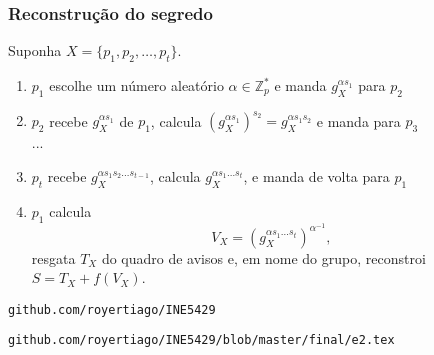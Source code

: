 \documentclass{beamer}
\begin{document}
\begin{frame}
    \frametitle{Reconstrução do segredo}
    Suponha $X = \{p_1, p_2, \ldots, p_t\}$.
    \begin{enumerate}
        \item<2-> $p_1$ escolhe um número aleatório $\alpha \in \mathbb Z_p^*$
            e manda $g_X^{\alpha s_1}$ para $p_2$
        \item<3-> $p_2$ recebe $g_X^{\alpha s_1}$ de $p_1$,
            calcula $(g_X^{\alpha s_1})^{s_2} = g_X^{\alpha s_1 s_2}$
            e manda para $p_3$ \\
            ...
        \item<4-> $p_t$ recebe $g_X^{\alpha s_1 s_2 \dots s_{t-1}}$,
            calcula $g_X^{\alpha s_1 \dots s_t}$,
            e manda de volta para $p_1$
        \item<5-> $p_1$ calcula
            \begin{equation*}
                V_X = (g_X^{\alpha s_1 \dots s_t})^{\alpha^{-1}},
            \end{equation*}
            resgata $T_X$ do quadro de avisos e,
            em nome do grupo,
            reconstroi $S = T_X + f(V_X)$.
    \end{enumerate}
\end{frame}

\begin{frame}

    \texttt{github.com/royertiago/INE5429}

    \texttt{github.com/royertiago/INE5429/blob/master/final/e2.tex}

\end{frame}
\end{document}
